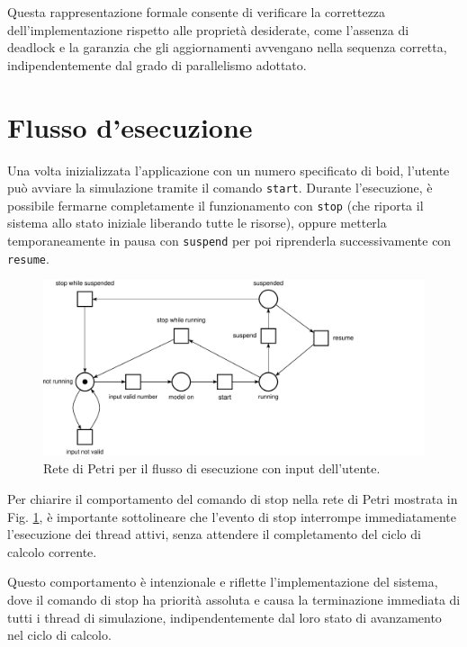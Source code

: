 \documentclass[a4paper,12pt]{report}
\begin{document}
    Questa rappresentazione formale consente di verificare la correttezza dell'implementazione rispetto alle proprietà desiderate, come l'assenza di deadlock e la garanzia che gli aggiornamenti avvengano nella sequenza corretta, indipendentemente dal grado di parallelismo adottato.
    
    \section{Flusso d'esecuzione}
        Una volta inizializzata l'applicazione con un numero specificato di boid, l'utente può avviare la simulazione tramite il comando \texttt{start}. Durante l'esecuzione, è possibile fermarne completamente il funzionamento con \texttt{stop} (che riporta il sistema allo stato iniziale liberando tutte le risorse), oppure metterla temporaneamente in pausa con \texttt{suspend} per poi riprenderla successivamente con \texttt{resume}.
        \begin{figure}[h!]
            \centering
            \includegraphics[width=\textwidth]{petri_nets_pdf/rete_app_flow.pdf}
            \caption{Rete di Petri per il flusso di esecuzione con input dell'utente.}
            \label{fig:rete_app_flow}
        \end{figure}
        
        Per chiarire il comportamento del comando di stop nella rete di Petri mostrata in Fig. \ref{fig:rete_app_flow}, è importante sottolineare che l'evento di stop interrompe immediatamente l'esecuzione dei thread attivi, senza attendere il completamento del ciclo di calcolo corrente.
        
        Questo comportamento è intenzionale e riflette l'implementazione del sistema, dove il comando di stop ha priorità assoluta e causa la terminazione immediata di tutti i thread di simulazione, indipendentemente dal loro stato di avanzamento nel ciclo di calcolo.
    
\end{document}
